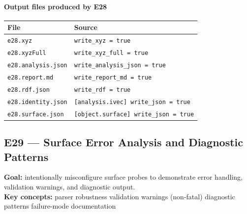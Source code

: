 \documentclass[11pt,a4paper]{article}
\begin{document}
\paragraph{Output files produced by E28}

\begin{center}\footnotesize
\begin{tabular}{@{}ll@{}}
\toprule
File & Source \\
\midrule
\texttt{e28.xyz} & \texttt{write\_xyz = true} \\
\texttt{e28.xyzFull} & \texttt{write\_xyz\_full = true} \\
\texttt{e28.analysis.json} & \texttt{write\_analysis\_json = true} \\
\texttt{e28.report.md} & \texttt{write\_report\_md = true} \\
\texttt{e28.rdf.json} & \texttt{write\_rdf = true} \\
\texttt{e28.identity.json} & \texttt{[analysis.ivec] write\_json = true} \\
\texttt{e28.surface.json} & \texttt{[object.surface] write\_json = true} \\
\bottomrule
\end{tabular}
\end{center}

\subsection*{E29 --- Surface Error Analysis and Diagnostic Patterns}

\textbf{Goal:} intentionally misconfigure surface probes to demonstrate error
handling, validation warnings, and diagnostic output.\\
\textbf{Key concepts:} parser robustness \textbullet{} validation warnings
(non-fatal) \textbullet{} diagnostic patterns \textbullet{} failure-mode documentation
\end{document}
